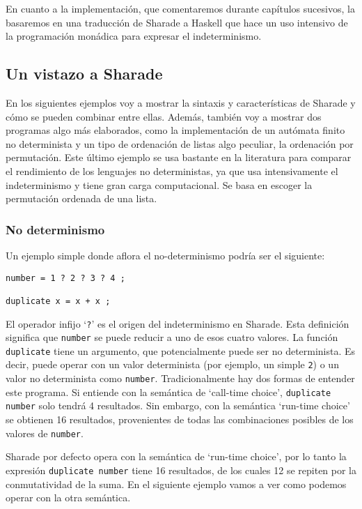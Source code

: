 \documentclass[class=article, crop=false]{standalone}
\begin{document}
En cuanto a la implementación, que comentaremos durante capítulos sucesivos, la basaremos en
una traducción de Sharade a Haskell que hace un uso intensivo de la programación monádica
para expresar el indeterminismo.

\subsection{Un vistazo a Sharade}\label{sec:vistazo_sharade}

En los siguientes ejemplos voy a mostrar la sintaxis y características de Sharade y cómo se
pueden combinar entre ellas. Además, también voy a mostrar dos programas algo más elaborados,
como la implementación de un autómata finito no determinista y un tipo de ordenación de
listas algo peculiar, la ordenación por permutación. Este último ejemplo se usa bastante en
la literatura para comparar el rendimiento de los lenguajes no deterministas, ya que usa
intensivamente el indeterminismo y tiene gran carga computacional. Se basa en escoger la
permutación ordenada de una lista.

\subsubsection{No determinismo}

Un ejemplo simple donde aflora el no-determinismo podría ser el siguiente:

\begin{verbatim}
number = 1 ? 2 ? 3 ? 4 ;

duplicate x = x + x ;
\end{verbatim}

El operador infijo `\verb`?`' es el origen del indeterminismo en Sharade. Esta definición
significa que \verb`number` se puede reducir a uno de esos cuatro valores. La función
\verb`duplicate` tiene un argumento, que potencialmente puede ser no determinista. Es decir,
puede operar con un valor determinista (por ejemplo, un simple \verb`2`) o un valor no
determinista como \verb`number`. Tradicionalmente hay dos formas de entender este programa.
Si entiende con la semántica de `call-time choice', \verb`duplicate number` solo tendrá 4
resultados. Sin embargo, con la semántica `run-time choice' se obtienen 16 resultados,
provenientes de todas las combinaciones posibles de los valores de \verb`number`.

Sharade por defecto opera con la semántica de `run-time choice', por lo tanto la expresión
\verb`duplicate number` tiene 16 resultados, de los cuales 12 se repiten por la
conmutatividad de la suma. En el siguiente ejemplo vamos a ver como podemos operar con la
otra semántica.
\end{document}

